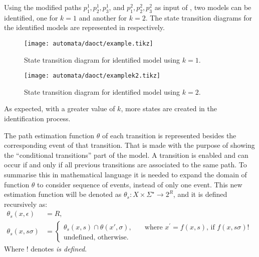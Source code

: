 Using the modified paths $p_1^1,p_2^1,p_3^1$,
and $p_1^2,p_2^2,p_3^2$ as input of , two models can be identified, one for $k=1$ and another for
$k=2$.
The state transition diagrams for the identified models are represented in  respectively. 

\begin{figure}[H]
  \centering \texttt{[image: automata/daoct/example.tikz]}
  \caption{State transition diagram for identified model using $k=1$.}
  \label{fig:examplek1}
\end{figure}


\begin{figure}[H]
  \centering \texttt{[image: automata/daoct/examplek2.tikz]}
  \caption{State transition diagram for identified model using $k=2$.}
  \label{fig:examplek2}
\end{figure}

As expected, with a greater value of $k$, more states are created in the
identification process.

The path estimation function $\theta$ of each transition is represented
besides the corresponding event of that transition. That is made with the
purpose of showing the ``conditional transitions'' part of the \DAOCT{} model. A
transition is enabled and can occur if and only if all previous transitions are
associated to the same path. To summarise this in mathematical language it is
needed to expand the domain of function $\theta$ to consider sequence of events,
instead of only one event. This new estimation function will be denoted as
$\theta_s : X \times \Sigma^\star \rightarrow 2^R$, and it is defined
recursively as:
\begin{align}
  \theta_s(x,\epsilon)&=R,\nonumber\\
  \theta_s(x,s\sigma)&=
                       \begin{cases}
                         \theta_s(x,s) \cap \theta(x',\sigma),       & \quad \text{where $x^\prime = f(x,s)$, if $f(x,s\sigma)!$ }\\
                         \text{undefined, otherwise.}  &
                       \end{cases}
\end{align}
Where ! denotes \emph{is defined}.

